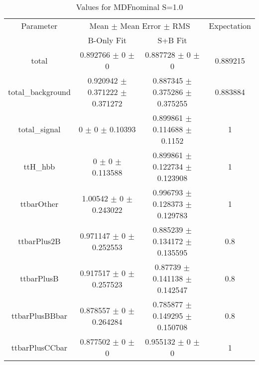 \begin{table}
\centering
\caption{Values for MDFnominal S=1.0}
\begin{tabular}{cccc}
\toprule
Parameter & \multicolumn{2}{c}{Mean $\pm$ Mean Error $\pm$ RMS} & Expectation\\
 & B-Only Fit & S+B Fit & \\
\midrule
total & \num{0.892766} $\pm$ \num{0} $\pm$ \num{0} & \num{0.887728} $\pm$ \num{0} $\pm$ \num{0} & \num{0.889215}\\
total\_background & \num{0.920942} $\pm$ \num{0.371222} $\pm$ \num{0.371272} & \num{0.887345} $\pm$ \num{0.375286} $\pm$ \num{0.375255} & \num{0.883884}\\
total\_signal & \num{0} $\pm$ \num{0} $\pm$ \num{0.10393} & \num{0.899861} $\pm$ \num{0.114688} $\pm$ \num{0.1152} & \num{1}\\
ttH\_hbb & \num{0} $\pm$ \num{0} $\pm$ \num{0.113588} & \num{0.899861} $\pm$ \num{0.122734} $\pm$ \num{0.123908} & \num{1}\\
ttbarOther & \num{1.00542} $\pm$ \num{0} $\pm$ \num{0.243022} & \num{0.996793} $\pm$ \num{0.128373} $\pm$ \num{0.129783} & \num{1}\\
ttbarPlus2B & \num{0.971147} $\pm$ \num{0} $\pm$ \num{0.252553} & \num{0.885239} $\pm$ \num{0.134172} $\pm$ \num{0.135595} & \num{0.8}\\
ttbarPlusB & \num{0.917517} $\pm$ \num{0} $\pm$ \num{0.257523} & \num{0.87739} $\pm$ \num{0.141138} $\pm$ \num{0.142547} & \num{0.8}\\
ttbarPlusBBbar & \num{0.878557} $\pm$ \num{0} $\pm$ \num{0.264284} & \num{0.785877} $\pm$ \num{0.149295} $\pm$ \num{0.150708} & \num{0.8}\\
ttbarPlusCCbar & \num{0.877502} $\pm$ \num{0} $\pm$ \num{0} & \num{0.955132} $\pm$ \num{0} $\pm$ \num{0} & \num{1}\\
\bottomrule
\end{tabular}
\end{table}